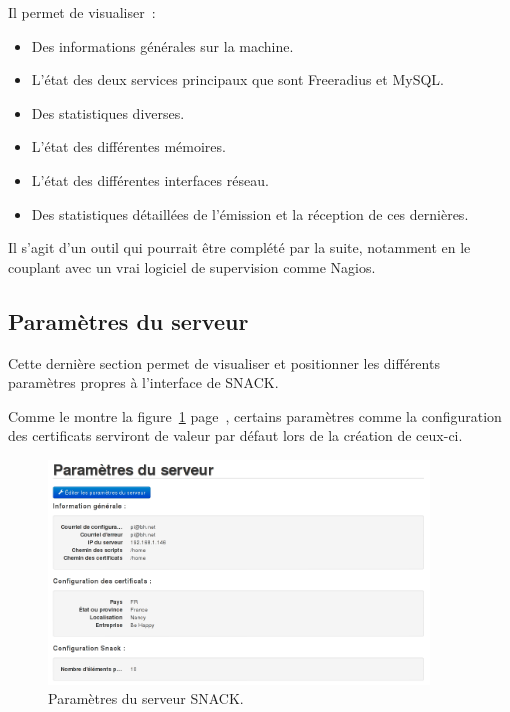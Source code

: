 Il permet de visualiser~:

\begin{itemize}
\item Des informations générales sur la machine.
\item L'état des deux services principaux que sont Freeradius et MySQL.
\item Des statistiques diverses.
\item L'état des différentes mémoires.
\item L'état des différentes interfaces réseau.
\item Des statistiques détaillées de l'émission et la réception de ces dernières.
\end{itemize}

Il s'agit d'un outil qui pourrait être complété par la suite, notamment en le couplant avec un vrai logiciel de supervision comme Nagios.

\subsection{Paramètres du serveur}

Cette dernière section permet de visualiser et positionner les différents paramètres propres à l'interface de SNACK.

Comme le montre la figure~\ref{parametres} page~\pageref{parametres}, certains paramètres comme la configuration des certificats serviront de valeur par défaut lors de la création de ceux-ci.

\begin{figure}[!h]
	\begin{center}
	    \includegraphics[width=0.9\textwidth]{img/parametres.png}
	\end{center}
	\caption{Paramètres du serveur SNACK.}
	\label{parametres}
\end{figure}

